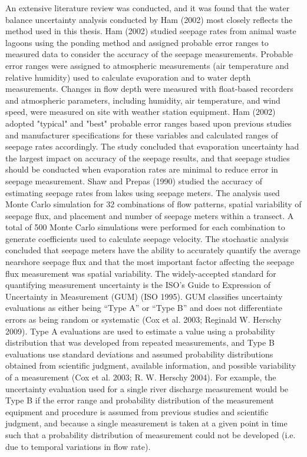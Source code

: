 \begin{linenumbers}
An extensive literature review was conducted, and it was found that the water balance uncertainty analysis conducted by Ham (2002) most closely reflects the method used in this thesis.  Ham (2002) studied seepage rates from animal waste lagoons using the ponding method and assigned probable error ranges to measured data to consider the accuracy of the seepage measurements.  Probable error ranges were assigned to atmospheric measurements (air temperature and relative humidity) used to calculate evaporation and to water depth measurements.  Changes in flow depth were measured with float-based recorders and atmospheric parameters, including humidity, air temperature, and wind speed, were measured on site with weather station equipment.   Ham (2002) adopted "typical" and "best" probable error ranges based upon previous studies and manufacturer specifications for these variables and calculated ranges of seepage rates accordingly.  The study concluded that evaporation uncertainty had the largest impact on accuracy of the seepage results, and that seepage studies should be conducted when evaporation rates are minimal to reduce error in seepage measurement.  
Shaw and Prepas (1990) studied the accuracy of estimating seepage rates from lakes using seepage meters.  The analysis used Monte Carlo simulation for 32 combinations of flow patterns, spatial variability of seepage flux, and placement and number of seepage meters within a transect.  A total of 500 Monte Carlo simulations were performed for each combination to generate coefficients used to calculate seepage velocity.  The stochastic analysis concluded that seepage meters have the ability to accurately quantify the average nearshore seepage flux and that the most important factor affecting the seepage flux measurement was spatial variability.
The widely-accepted standard for quantifying measurement uncertainty is the ISO’s Guide to Expression of Uncertainty in Measurement (GUM) (ISO 1995).  GUM classifies uncertainty evaluations as either being “Type A” or “Type B” and does not differentiate errors as being random or systematic (Cox et al. 2003; Reginald W. Herschy 2009).  Type A evaluations are used to estimate a value using a probability distribution that was developed from repeated measurements, and Type B evaluations use standard deviations and assumed probability distributions obtained from scientific judgment, available information, and possible variability of a measurement (Cox et al. 2003; R. W. Herschy 2004).  For example, the uncertainty evaluation used for a single river discharge measurement would be Type B if the error range and probability distribution of the measurement equipment and procedure is assumed from previous studies and scientific judgment, and because a single measurement is taken at a given point in time such that a probability distribution of measurement could not be developed (i.e. due to temporal variations in flow rate).

\end{linenumbers}
